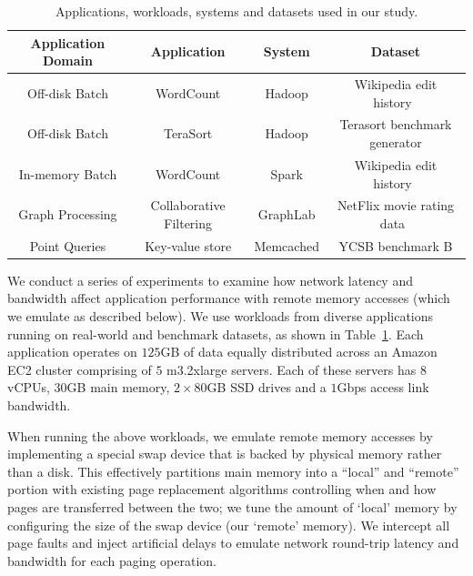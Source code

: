 %
\begin{table}
  \centering
  \small
  \begin{tabular}{c|c|c|c}
		\textbf{Application Domain} & \textbf{Application} & \textbf{System} & \textbf{Dataset} \\\hline \hline
    Off-disk Batch & WordCount & Hadoop & Wikipedia edit history~\cite{wikipedia}\\\hline
    Off-disk Batch & TeraSort & Hadoop & Terasort benchmark generator\\\hline
    In-memory Batch & WordCount & Spark & Wikipedia edit history~\cite{wikipedia}\\\hline
    Graph Processing & Collaborative Filtering & GraphLab & NetFlix movie rating data~\cite{netflix}\\\hline
    Point Queries & Key-value store & Memcached & YCSB benchmark B\\\hline
    \hline
  \end{tabular}
  \vspace{0.1in}
  \caption{\small{Applications, workloads, systems and datasets used in our study.}}
  \label{tab:workloads}
\end{table}

%

We conduct a series of experiments to examine how network latency and bandwidth affect application performance with remote memory accesses (which we emulate as described below). 
We use workloads from diverse applications running on real-world and benchmark datasets, as shown in Table~\ref{tab:workloads}. %
 Each application operates on $125$GB of data equally distributed across an Amazon EC2 cluster comprising of $5$ m3.2xlarge servers. Each of these servers has $8$ vCPUs, $30$GB main memory, $2 \times 80$GB SSD drives and a $1$Gbps access link bandwidth.


When running the above workloads, we emulate remote memory accesses by implementing a special swap device that is backed by physical memory rather than a disk. This effectively partitions main memory into a ``local'' and ``remote'' portion 
with existing page replacement algorithms controlling when and how pages are transferred between the two; we tune the amount of `local' memory by configuring the size of the swap device (our `remote' memory).
We intercept all page faults and inject artificial delays to emulate network round-trip latency and bandwidth for each paging operation. 

